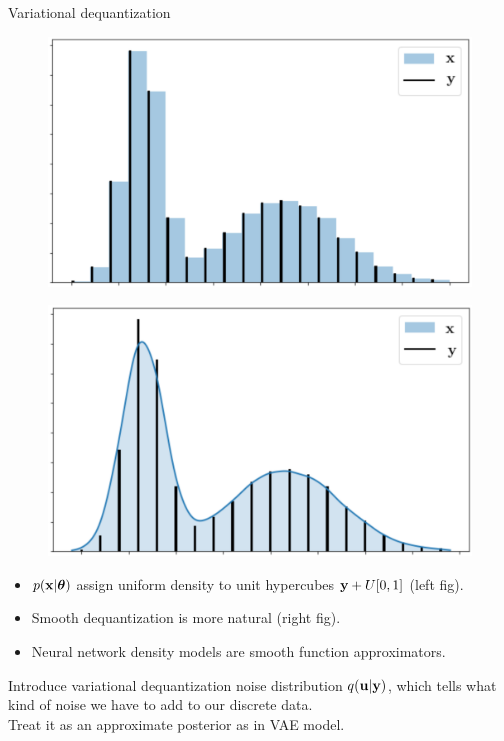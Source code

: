 \documentclass{beamer}
\begin{document}
\begin{frame}{Variational dequantization}
	\begin{minipage}[t]{0.5\columnwidth}
		\begin{figure}
			\centering
			\includegraphics[width=0.8\linewidth]{figs/uniform_dequantization.png}
		\end{figure}
	\end{minipage}%
	\begin{minipage}[t]{0.5\columnwidth}
		\begin{figure}
			\centering
			\includegraphics[width=0.8\linewidth]{figs/variational_dequantization.png}
		\end{figure}
	\end{minipage}
	\begin{itemize}
		\item $p(\mathbf{x} | \boldsymbol{\theta})$ assign uniform density to unit hypercubes $\mathbf{y} + U[0, 1]$ (left fig).
		\item Smooth dequantization is more natural (right fig).
		\item Neural network density models are smooth function approximators.
	\end{itemize}
	Introduce variational dequantization noise distribution $q(\mathbf{u} | \mathbf{y})$, which tells what kind of noise we have to add to our discrete data.  \\
	Treat it as an approximate posterior as in VAE model. 
\end{frame}
\end{document}
